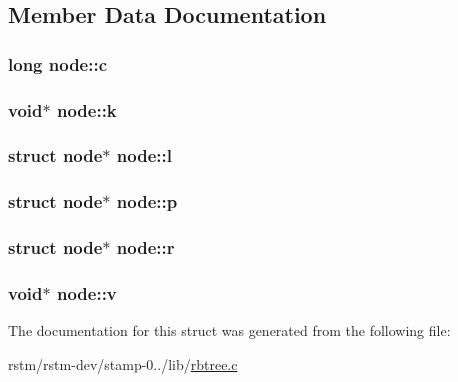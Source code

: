 \subsection{Member Data Documentation}
\hypertarget{structnode_a7742792bd89a935bd9f1122edbb73d69}{
\subsubsection[{c}]{\setlength{\rightskip}{0pt plus 5cm}long node\-::c}}\label{structnode_a7742792bd89a935bd9f1122edbb73d69}
\hypertarget{structnode_a06123aeb6587dae270d797c7135bf870}{
\subsubsection[{k}]{\setlength{\rightskip}{0pt plus 5cm}void$\ast$ node\-::k}}\label{structnode_a06123aeb6587dae270d797c7135bf870}
\hypertarget{structnode_a3c3d6a903c5d1354fbeabc93dc2b71d6}{
\subsubsection[{l}]{\setlength{\rightskip}{0pt plus 5cm}struct {\bf node}$\ast$ node\-::l}}\label{structnode_a3c3d6a903c5d1354fbeabc93dc2b71d6}
\hypertarget{structnode_add6b89fbf83ba5f857eedee86699a515}{
\subsubsection[{p}]{\setlength{\rightskip}{0pt plus 5cm}struct {\bf node}$\ast$ node\-::p}}\label{structnode_add6b89fbf83ba5f857eedee86699a515}
\hypertarget{structnode_a3f9eaef9329fc8fdf57fe684e503d0a9}{
\subsubsection[{r}]{\setlength{\rightskip}{0pt plus 5cm}struct {\bf node}$\ast$ node\-::r}}\label{structnode_a3f9eaef9329fc8fdf57fe684e503d0a9}
\hypertarget{structnode_aa5d7896b42e0a397179499e031651bfb}{
\subsubsection[{v}]{\setlength{\rightskip}{0pt plus 5cm}void$\ast$ node\-::v}}\label{structnode_aa5d7896b42e0a397179499e031651bfb}


The documentation for this struct was generated from the following file\-:\begin{DoxyCompactItemize}
\item 
rstm/rstm-\/dev/stamp-\/0../lib/\hyperlink{rbtree_8c}{rbtree.\-c}\end{DoxyCompactItemize}
